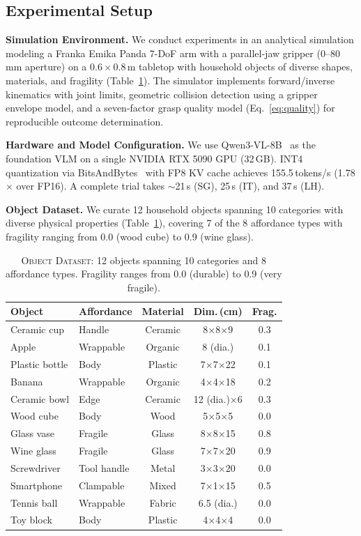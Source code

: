 \documentclass[letterpaper, 10pt, conference]{ieeeconf}
\begin{document}
\subsection{Experimental Setup}
\label{sec:setup}

\textbf{Simulation Environment.}
We conduct experiments in an analytical simulation modeling a Franka Emika Panda 7-DoF arm with a parallel-jaw gripper (0--80\,mm aperture) on a $0.6 \times 0.8$\,m tabletop with household objects of diverse shapes, materials, and fragility (Table~\ref{tab:objects}).
The simulator implements forward/inverse kinematics with joint limits, geometric collision detection using a gripper envelope model, and a seven-factor grasp quality model (Eq.~\ref{eq:quality}) for reproducible outcome determination.

\textbf{Hardware and Model Configuration.}
We use Qwen3-VL-8B~\cite{bai2025qwen3} as the foundation VLM on a single NVIDIA RTX 5090 GPU (32\,GB).
INT4 quantization via BitsAndBytes~\cite{dettmers2024bnb} with FP8 KV cache achieves 155.5\,tokens/s (1.78$\times$ over FP16).
A complete trial takes $\sim$21\,s (SG), 25\,s (IT), and 37\,s (LH).

\textbf{Object Dataset.}
We curate 12 household objects spanning 10 categories with diverse physical properties (Table~\ref{tab:objects}), covering 7 of the 8 affordance types with fragility ranging from 0.0 (wood cube) to 0.9 (wine glass).

\begin{table}[t]
\centering
\caption{\textsc{Object Dataset}: 12 objects spanning 10 categories and 8 affordance types. Fragility ranges from 0.0 (durable) to 0.9 (very fragile).}
\label{tab:objects}
\renewcommand{\arraystretch}{1.05}
\setlength{\tabcolsep}{2pt}
\begin{tabular}{@{}llccc@{}}
\toprule
\textbf{Object} & \textbf{Affordance} & \textbf{Material} & \textbf{Dim.\,(cm)} & \textbf{Frag.} \\
\midrule
Ceramic cup & Handle & Ceramic & 8$\times$8$\times$9 & 0.3 \\
Apple & Wrappable & Organic & 8 (dia.) & 0.1 \\
Plastic bottle & Body & Plastic & 7$\times$7$\times$22 & 0.1 \\
Banana & Wrappable & Organic & 4$\times$4$\times$18 & 0.2 \\
Ceramic bowl & Edge & Ceramic & 12 (dia.)$\times$6 & 0.3 \\
Wood cube & Body & Wood & 5$\times$5$\times$5 & 0.0 \\
Glass vase & Fragile & Glass & 8$\times$8$\times$15 & 0.8 \\
Wine glass & Fragile & Glass & 7$\times$7$\times$20 & 0.9 \\
Screwdriver & Tool handle & Metal & 3$\times$3$\times$20 & 0.0 \\
Smartphone & Clampable & Mixed & 7$\times$1$\times$15 & 0.5 \\
Tennis ball & Wrappable & Fabric & 6.5 (dia.) & 0.0 \\
Toy block & Body & Plastic & 4$\times$4$\times$4 & 0.0 \\
\bottomrule
\end{tabular}
\end{table}
\end{document}
